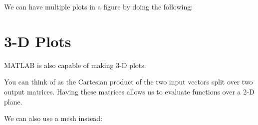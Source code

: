 \documentclass{article}
\begin{document}
We can have multiple plots in a figure by doing the following:



\section{3-D Plots}

MATLAB is also capable of making 3-D plots:


You can think of  as the Cartesian product of the two input
vectors split over two output matrices.  Having these matrices allows us
to evaluate functions over a 2-D plane.

\newpage

We can also use a mesh instead:

\end{document}
